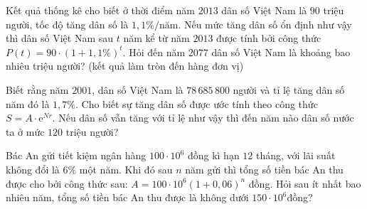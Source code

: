 \begin{ex}%
	Kết quả thống kê cho biết ở thời điểm năm $2013$ dân số Việt Nam là $90$ triệu người, tốc độ tăng dân số là $1{,}1\% /$năm. Nếu mức tăng dân số ổn định như vậy thì dân số  Việt Nam sau $t$ năm kể từ năm $2013$ được tính bởi công thức $P(t)=90\cdot(1+1{,}1\%)^t $. Hỏi đến năm $2077$ dân số Việt Nam là khoảng bao nhiêu triệu người? (kết quả làm tròn đến hàng đơn vị)
\end{ex}

\begin{ex}%
	Biết rằng năm $2001$, dân số Việt Nam là $78\,685\,800$ người và tỉ lệ tăng dân số năm đó là $1{,}7\% $. Cho biết sự tăng dân số được ước tính  theo công thức $S=A\cdot \mathrm{e}^{Nr} $. Nếu dân số vẫn tăng với tỉ lệ như vậy thì đến năm nào dân số nước ta ở mức $120$ triệu người?
\end{ex}

\begin{ex}%
	Bác An gửi tiết kiệm ngân hàng $100\cdot10^6 $ đồng kì hạn $12$ tháng, với lãi suất không  đổi là $6\% $ một năm. Khi đó sau $n$ năm gửi thì tổng số tiền bác An thu được cho bởi công thức sau: $A=100\cdot10^6 (1+0{,}06)^n $ đồng. Hỏi sau ít nhất bao nhiêu năm, tổng số tiền bác An thu được là không dưới $150\cdot10^6 $đồng?
\end{ex}

